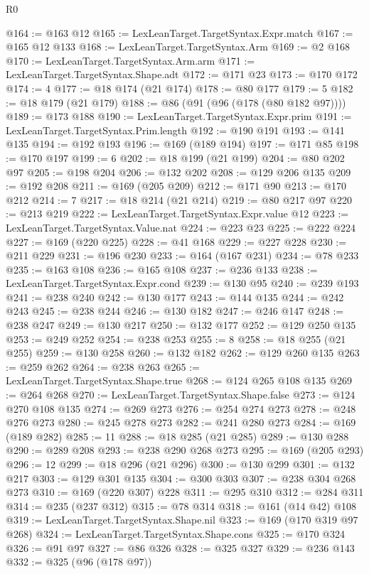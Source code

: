 \begin{lexlean}{R0}
\begin{coremodule}
@164 := @163 @12
@165 := LexLeanTarget.TargetSyntax.Expr.match
@167 := @165 @12 @133
@168 := LexLeanTarget.TargetSyntax.Arm
@169 := @2 @168
@170 := LexLeanTarget.TargetSyntax.Arm.arm
@171 := LexLeanTarget.TargetSyntax.Shape.adt
@172 := @171 @23
@173 := @170 @172
@174 := 4
@177 := @18 @174 (@21 @174)
@178 := @80 @177
@179 := 5
@182 := @18 @179 (@21 @179)
@188 := @86 (@91 (@96 (@178 (@80 @182 @97))))
@189 := @173 @188
@190 := LexLeanTarget.TargetSyntax.Expr.prim
@191 := LexLeanTarget.TargetSyntax.Prim.length
@192 := @190 @191
@193 := @141 @135
@194 := @192 @193
@196 := @169 (@189 @194)
@197 := @171 @85
@198 := @170 @197
@199 := 6
@202 := @18 @199 (@21 @199)
@204 := @80 @202 @97
@205 := @198 @204
@206 := @132 @202
@208 := @129 @206 @135
@209 := @192 @208
@211 := @169 (@205 @209)
@212 := @171 @90
@213 := @170 @212
@214 := 7
@217 := @18 @214 (@21 @214)
@219 := @80 @217 @97
@220 := @213 @219
@222 := LexLeanTarget.TargetSyntax.Expr.value @12
@223 := LexLeanTarget.TargetSyntax.Value.nat
@224 := @223 @23
@225 := @222 @224
@227 := @169 (@220 @225)
@228 := @41 @168
@229 := @227 @228
@230 := @211 @229
@231 := @196 @230
@233 := @164 (@167 @231)
@234 := @78 @233
@235 := @163 @108
@236 := @165 @108
@237 := @236 @133
@238 := LexLeanTarget.TargetSyntax.Expr.cond
@239 := @130 @95
@240 := @239 @193
@241 := @238 @240
@242 := @130 @177
@243 := @144 @135
@244 := @242 @243
@245 := @238 @244
@246 := @130 @182
@247 := @246 @147
@248 := @238 @247
@249 := @130 @217
@250 := @132 @177
@252 := @129 @250 @135
@253 := @249 @252
@254 := @238 @253
@255 := 8
@258 := @18 @255 (@21 @255)
@259 := @130 @258
@260 := @132 @182
@262 := @129 @260 @135
@263 := @259 @262
@264 := @238 @263
@265 := LexLeanTarget.TargetSyntax.Shape.true
@268 := @124 @265 @108 @135
@269 := @264 @268
@270 := LexLeanTarget.TargetSyntax.Shape.false
@273 := @124 @270 @108 @135
@274 := @269 @273
@276 := @254 @274 @273
@278 := @248 @276 @273
@280 := @245 @278 @273
@282 := @241 @280 @273
@284 := @169 (@189 @282)
@285 := 11
@288 := @18 @285 (@21 @285)
@289 := @130 @288
@290 := @289 @208
@293 := @238 @290 @268 @273
@295 := @169 (@205 @293)
@296 := 12
@299 := @18 @296 (@21 @296)
@300 := @130 @299
@301 := @132 @217
@303 := @129 @301 @135
@304 := @300 @303
@307 := @238 @304 @268 @273
@310 := @169 (@220 @307) @228
@311 := @295 @310
@312 := @284 @311
@314 := @235 (@237 @312)
@315 := @78 @314
@318 := @161 (@14 @42) @108
@319 := LexLeanTarget.TargetSyntax.Shape.nil
@323 := @169 (@170 @319 @97 @268)
@324 := LexLeanTarget.TargetSyntax.Shape.cons
@325 := @170 @324
@326 := @91 @97
@327 := @86 @326
@328 := @325 @327
@329 := @236 @143
@332 := @325 (@96 (@178 @97))

\end{coremodule}
\end{lexlean}

